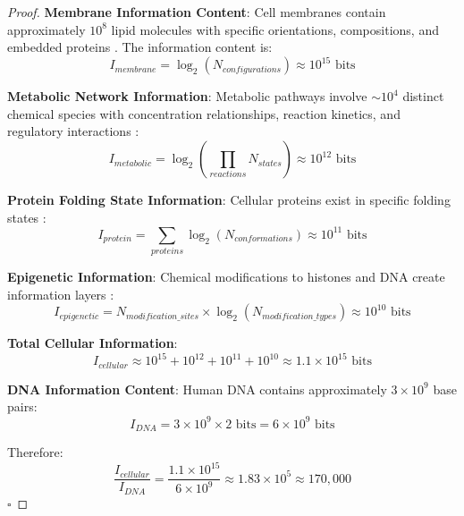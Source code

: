 \documentclass[12pt,a4paper]{article}
\begin{document}
\begin{proof}
\textbf{Membrane Information Content}: Cell membranes contain approximately $10^8$ lipid molecules with specific orientations, compositions, and embedded proteins \cite{alberts2014molecular}. The information content is:
\begin{equation}
I_{membrane} = \log_2(N_{configurations}) \approx 10^{15} \text{ bits}
\end{equation}

\textbf{Metabolic Network Information}: Metabolic pathways involve $\sim 10^4$ distinct chemical species with concentration relationships, reaction kinetics, and regulatory interactions \cite{kanehisa2000kegg}:
\begin{equation}
I_{metabolic} = \log_2\left(\prod_{reactions} N_{states}\right) \approx 10^{12} \text{ bits}
\end{equation}

\textbf{Protein Folding State Information}: Cellular proteins exist in specific folding states \cite{nelson2017lehninger}:
\begin{equation}
I_{protein} = \sum_{proteins} \log_2(N_{conformations}) \approx 10^{11} \text{ bits}
\end{equation}

\textbf{Epigenetic Information}: Chemical modifications to histones and DNA create information layers \cite{encode2012integrated}:
\begin{equation}
I_{epigenetic} = N_{modification\_sites} \times \log_2(N_{modification\_types}) \approx 10^{10} \text{ bits}
\end{equation}

\textbf{Total Cellular Information}:
\begin{equation}
I_{cellular} \approx 10^{15} + 10^{12} + 10^{11} + 10^{10} \approx 1.1 \times 10^{15} \text{ bits}
\end{equation}

\textbf{DNA Information Content}: Human DNA contains approximately $3 \times 10^9$ base pairs:
\begin{equation}
I_{DNA} = 3 \times 10^9 \times 2 \text{ bits} = 6 \times 10^9 \text{ bits}
\end{equation}

Therefore:
\begin{equation}
\frac{I_{cellular}}{I_{DNA}} = \frac{1.1 \times 10^{15}}{6 \times 10^9} \approx 1.83 \times 10^5 \approx 170,000
\end{equation}
$\square$
\end{proof}
\end{document}
